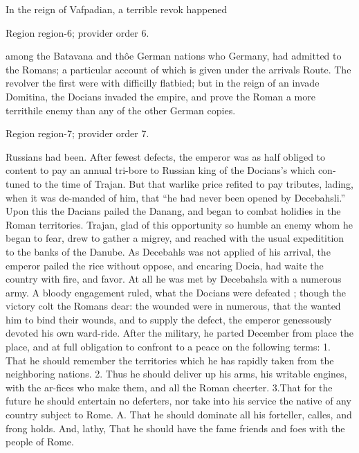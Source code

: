 \documentclass[11pt]{article}
\begin{document}
In the reign of Vafpadian, a terrible revok happened
\par

{\scriptsize\color{gray} Region region-6; provider order 6.\par}
\medskip

among the Batavana and thôe German nations who Germany, had admitted to the Romans; a particular account of which is given under the arrivals Route. The revolver the first were with difficilly flatbied; but in the reign of an invade Domitina, the Docians invaded the empire, and prove the Roman a more territhile enemy than any of the other German copies.
\par

{\scriptsize\color{gray} Region region-7; provider order 7.\par}
\medskip

Russians had been. After fewest defects, the emperor was as half obliged to content to pay an annual tri-bore to Russian king of the Docians’s which con-tuned to the time of Trajan. But that warlike price refited to pay tributes, lading, when it was de-manded of him, that “he had never been opened by Decebahsli.” Upon this the Dacians pailed the Danang, and began to combat holidies in the Roman territories. Trajan, glad of this opportunity so humble an enemy whom he began to fear, drew to gather a migrey, and reached with the usual expeditition to the banks of the Danube. As Decebahls was not applied of his arrival, the emperor pailed the rice without oppose, and encaring Docia, had waite the country with fire, and favor. At all he was met by Decebahsla with a numerous army. A bloody engagement ruled, what the Docians were defeated ; though the victory colt the Romans dear: the wounded were in numerous, that the wanted him to bind their wounds, and to supply the defect, the emperor genessously devoted his own ward-ride. After the military, he parted December from place the place, and at full obligation to confront to a peace on the following terms: 1. That he should remember the territories which he has rapidly taken from the neighboring nations. 2. Thus he should deliver up his arms, his writable engines, with the ar-fices who make them, and all the Roman cheerter. 3.That for the future he should entertain no deferters, nor take into his service the native of any country subject to Rome. A. That he should dominate all his forteller, calles, and frong holds. And, lathy, That he should have the fame friends and foes with the people of Rome.
\par
\end{document}
